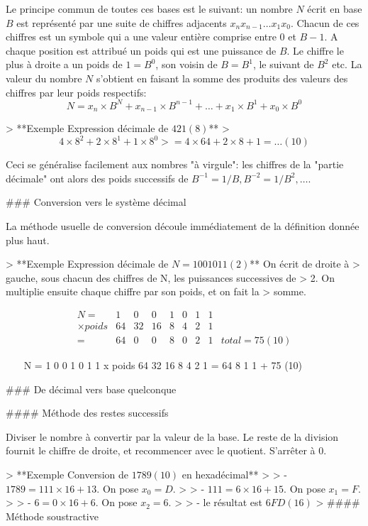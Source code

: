 Le principe commun de toutes ces bases est le suivant: un nombre $N$
écrit en base $B$ est représenté par une suite de chiffres adjacents
$x_n x_{n-1} \ldots x_1 x_0$. Chacun de ces chiffres est un symbole qui
a une valeur entière comprise entre 0 et $B-1$. A chaque position est
attribué un poids qui est une puissance de $B$. Le chiffre le plus à
droite a un poids de $1 = B^0$, son voisin de $B=B^1$, le suivant de
$B^2$ etc. La valeur du nombre $N$ s'obtient en faisant la somme des
produits des valeurs des chiffres par leur poids respectifs:
$$N = x_n \times B^N + x_{n-1} \times B^{n-1} +  \ldots + x_1 \times B^1
+ x_0 \times B^0$$

> **Exemple Expression décimale de $421(8)$**
> $$4 \times 8^2 + 2 \times 8^1 + 1 \times 8^0 
> = 4 \times 64 + 2 \times 8 + 1 = \ldots (10)$$

Ceci se généralise facilement aux nombres "à virgule": les chiffres de
la "partie décimale" ont alors des poids successifs de
$B^{-1} = 1/B, B^{-2} = 1/{B^2}, \ldots$.

### Conversion vers le système décimal

La méthode usuelle de conversion découle immédiatement de la définition
donnée plus haut.

> **Exemple Expression décimale de $N=1001011(2)$** On écrit de droite à
> gauche, sous chacun des chiffres de N, les puissances successives de
> 2. On multiplie ensuite chaque chiffre par son poids, et on fait la
> somme. 

$$\begin{array}{r|rrrrrrr|l}
N= &1 & 0 & 0 & 1 & 0 & 1 & 1 \\
\times poids &64 &32& 16& 8& 4 &2 &1 \\
\hline
= &64 & 0 & 0 & 8 & 0 & 2 & 1 & total =  75 (10)
\end{array}$$

~~~
 N =       1  0  0  1  0  1  1
 x poids  64 32 16  8  4  2  1 
 =        64        8     1  1  +  75 (10)
~~~

### De décimal vers base quelconque

#### Méthode des restes successifs

Diviser le nombre à convertir par la valeur de la base. Le reste de la
division fournit le chiffre de droite, et recommencer avec le quotient.
S'arrêter à 0.

> **Exemple Conversion de $1789 (10)$ en hexadécimal**
>
> -   $1789 = 111 \times 16 + 13$. On pose $x_0 = D$.
>
> -   $111 = 6 \times 16 + 15$. On pose $x_1 = F$.
>
> -   $6 = 0 \times 16 + 6$. On pose $x_2 = 6$.
>
> -   le résultat est $6FD (16)$
>
#### Méthode soustractive

